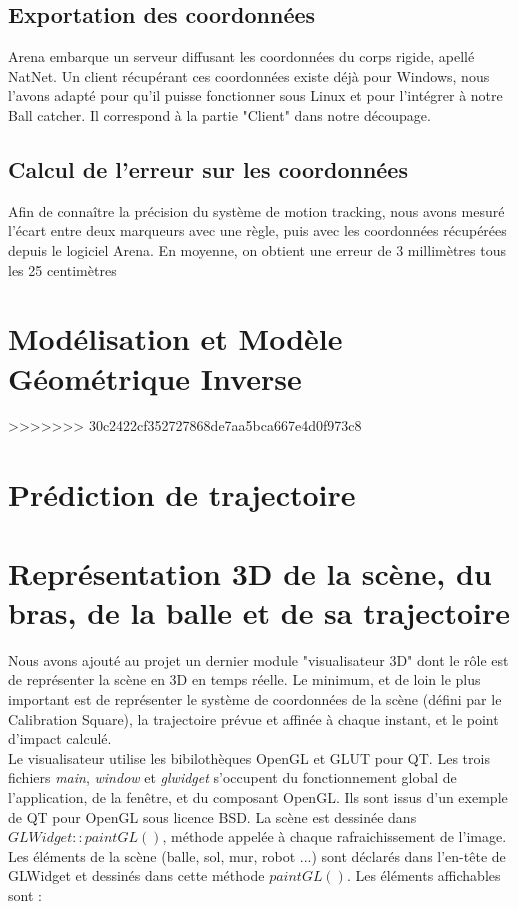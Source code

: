 \documentclass{article}[11pt]
\begin{document}
\subsection{Exportation des coordonnées}

Arena embarque un serveur diffusant les coordonnées du corps rigide, apellé NatNet. Un client récupérant ces coordonnées existe déjà pour Windows, nous l'avons adapté pour qu'il puisse fonctionner sous Linux et pour l'intégrer à notre Ball catcher. Il correspond à la partie "Client" dans notre découpage.

\subsection{Calcul de l'erreur sur les coordonnées}
Afin de connaître la précision du système de motion tracking, nous avons mesuré l'écart entre deux marqueurs avec une règle, puis avec les coordonnées récupérées depuis le logiciel Arena. En moyenne, on obtient une erreur de 3 millimètres tous les 25 centimètres 
\newpage
\section{Modélisation et Modèle Géométrique Inverse}


>>>>>>> 30c2422cf352727868de7aa5bca667e4d0f973c8
\section{Prédiction de trajectoire}


\section{Représentation 3D de la scène, du bras, de la balle et de sa trajectoire}

Nous avons ajouté au projet un dernier module "visualisateur 3D" dont le rôle est de représenter la scène en 3D en temps réelle. Le minimum, et de loin le plus important est de représenter le système de coordonnées de la scène (défini par le Calibration Square), la trajectoire prévue et affinée à chaque instant, et le point d'impact calculé. \\

Le visualisateur utilise les bibilothèques OpenGL et GLUT pour QT. Les trois fichiers \textit{main}, \textit{window} et \textit{glwidget} s'occupent du fonctionnement global de l'application, de la fenêtre, et du composant OpenGL. Ils sont issus d'un exemple de QT pour OpenGL sous licence BSD. La scène est dessinée dans $GLWidget::paintGL()$, méthode appelée à chaque rafraichissement de l'image. Les éléments de la scène (balle, sol, mur, robot ...) sont déclarés dans l'en-tête de GLWidget et dessinés dans cette méthode $paintGL()$. Les éléments affichables sont :\\
\end{document}
